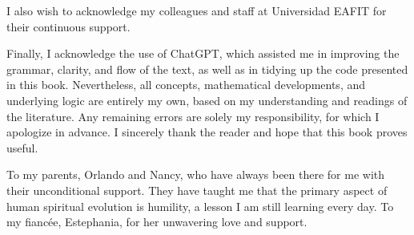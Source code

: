 I also wish to acknowledge my colleagues and staff at Universidad EAFIT for their continuous support.  

Finally, I acknowledge the use of ChatGPT, which assisted me in improving the grammar, clarity, and flow of the text, as well as in tidying up the code presented in this book. Nevertheless, all concepts, mathematical developments, and underlying logic are entirely my own, based on my understanding and readings of the literature. Any remaining errors are solely my responsibility, for which I apologize in advance. I sincerely thank the reader and hope that this book proves useful.  

To my parents, Orlando and Nancy, who have always been there for me with their unconditional support. They have taught me that the primary aspect of human spiritual evolution is humility, a lesson I am still learning every day. To my fiancée, Estephania, for her unwavering love and support.




